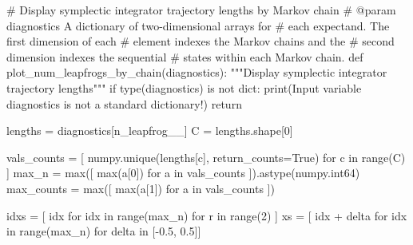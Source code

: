\documentclass[
  letterpaper,
  DIV=11,
  numbers=noendperiod]{scrartcl}
\newenvironment{Shaded}{\begin{snugshade}}{\end{snugshade}}
\newcommand{\BuiltInTok}[1]{\textcolor[rgb]{0.00,0.23,0.31}{#1}}
\newcommand{\CommentTok}[1]{\textcolor[rgb]{0.37,0.37,0.37}{#1}}
\newcommand{\ControlFlowTok}[1]{\textcolor[rgb]{0.00,0.23,0.31}{#1}}
\newcommand{\DecValTok}[1]{\textcolor[rgb]{0.68,0.00,0.00}{#1}}
\newcommand{\FloatTok}[1]{\textcolor[rgb]{0.68,0.00,0.00}{#1}}
\newcommand{\KeywordTok}[1]{\textcolor[rgb]{0.00,0.23,0.31}{#1}}
\newcommand{\NormalTok}[1]{\textcolor[rgb]{0.00,0.23,0.31}{#1}}
\newcommand{\OperatorTok}[1]{\textcolor[rgb]{0.37,0.37,0.37}{#1}}
\newcommand{\StringTok}[1]{\textcolor[rgb]{0.13,0.47,0.30}{#1}}
\newcommand{\VariableTok}[1]{\textcolor[rgb]{0.07,0.07,0.07}{#1}}
\begin{document}
\begin{Shaded}
\begin{Highlighting}[]

\CommentTok{\# Display symplectic integrator trajectory lengths by Markov chain}
\CommentTok{\# @param diagnostics A dictionary of two{-}dimensional arrays for }
\CommentTok{\#                    each expectand.  The first dimension of each}
\CommentTok{\#                    element indexes the Markov chains and the }
\CommentTok{\#                    second dimension indexes the sequential }
\CommentTok{\#                    states within each Markov chain.}
\KeywordTok{def}\NormalTok{ plot\_num\_leapfrogs\_by\_chain(diagnostics):}
  \CommentTok{"""Display symplectic integrator trajectory lengths"""}
  \ControlFlowTok{if} \BuiltInTok{type}\NormalTok{(diagnostics) }\KeywordTok{is} \KeywordTok{not} \BuiltInTok{dict}\NormalTok{:}
    \BuiltInTok{print}\NormalTok{(}\StringTok{\textquotesingle{}Input variable \textasciigrave{}diagnostics\textasciigrave{} is not a standard dictionary!\textquotesingle{}}\NormalTok{)}
    \ControlFlowTok{return}
  
\NormalTok{  lengths }\OperatorTok{=}\NormalTok{ diagnostics[}\StringTok{\textquotesingle{}n\_leapfrog\_\_\textquotesingle{}}\NormalTok{]}
\NormalTok{  C }\OperatorTok{=}\NormalTok{ lengths.shape[}\DecValTok{0}\NormalTok{]}
  
\NormalTok{  vals\_counts }\OperatorTok{=}\NormalTok{ [ numpy.unique(lengths[c], return\_counts}\OperatorTok{=}\VariableTok{True}\NormalTok{) }
                  \ControlFlowTok{for}\NormalTok{ c }\KeywordTok{in} \BuiltInTok{range}\NormalTok{(C) ] }
\NormalTok{  max\_n }\OperatorTok{=} \BuiltInTok{max}\NormalTok{([ }\BuiltInTok{max}\NormalTok{(a[}\DecValTok{0}\NormalTok{]) }\ControlFlowTok{for}\NormalTok{ a }\KeywordTok{in}\NormalTok{ vals\_counts ]).astype(numpy.int64)}
\NormalTok{  max\_counts }\OperatorTok{=} \BuiltInTok{max}\NormalTok{([ }\BuiltInTok{max}\NormalTok{(a[}\DecValTok{1}\NormalTok{]) }\ControlFlowTok{for}\NormalTok{ a }\KeywordTok{in}\NormalTok{ vals\_counts ])}
  
\NormalTok{  idxs }\OperatorTok{=}\NormalTok{ [ idx }\ControlFlowTok{for}\NormalTok{ idx }\KeywordTok{in} \BuiltInTok{range}\NormalTok{(max\_n) }\ControlFlowTok{for}\NormalTok{ r }\KeywordTok{in} \BuiltInTok{range}\NormalTok{(}\DecValTok{2}\NormalTok{) ]}
\NormalTok{  xs }\OperatorTok{=}\NormalTok{ [ idx }\OperatorTok{+}\NormalTok{ delta }\ControlFlowTok{for}\NormalTok{ idx }\KeywordTok{in} \BuiltInTok{range}\NormalTok{(max\_n) }\ControlFlowTok{for}\NormalTok{ delta }\KeywordTok{in}\NormalTok{ [}\OperatorTok{{-}}\FloatTok{0.5}\NormalTok{, }\FloatTok{0.5}\NormalTok{]]}
  

\end{Highlighting}
\end{Shaded}
\end{document}
